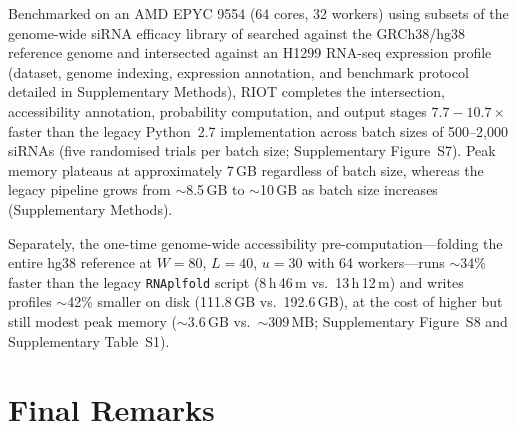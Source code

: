 Benchmarked on an AMD EPYC 9554 (64 cores, 32 workers) using subsets of the
genome-wide siRNA efficacy library of \citet{huesken2005design} searched against
the GRCh38/hg38 reference genome and intersected against an H1299
RNA-seq expression profile (dataset, genome indexing, expression annotation,
and benchmark protocol detailed in Supplementary Methods), RIOT completes the
intersection, accessibility annotation, probability computation, and output
stages $7.7{-}10.7\times$ faster than the legacy Python~2.7 implementation across
batch sizes of 500--2{,}000 siRNAs (five randomised trials per batch size;
Supplementary Figure~S7). Peak memory plateaus at approximately 7\,GB regardless
of batch size, whereas the legacy pipeline grows from $\sim$8.5\,GB to
$\sim$10\,GB as batch size increases (Supplementary Methods).

Separately, the one-time genome-wide accessibility pre-computation---folding the
entire hg38 reference at $W{=}80$, $L{=}40$, $u{=}30$ with 64
workers---runs $\sim$34\% faster than the legacy \texttt{RNAplfold} script
(8\,h\,46\,m vs.\ 13\,h\,12\,m) and writes profiles $\sim$42\% smaller on disk
(111.8\,GB vs.\ 192.6\,GB), at the cost of higher but still modest peak memory
($\sim$3.6\,GB vs.\ $\sim$309\,MB; Supplementary Figure~S8 and Supplementary
Table~S1).

\section{Final Remarks}

